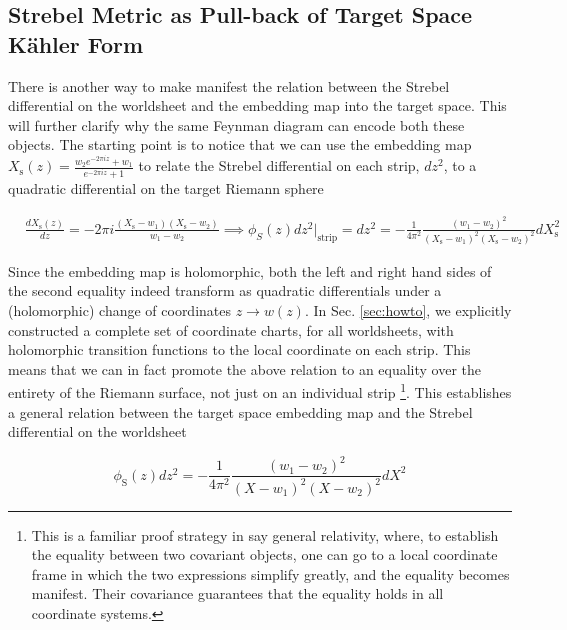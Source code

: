 \documentclass[english]{article}
\renewcommand{\>}{\rangle}
\newcommand{\<}{\langle}
\renewcommand{\(}{\left(}
\renewcommand{\)}{\right)}
\begin{document}
\subsection{Strebel Metric as Pull-back of Target Space Kähler Form} \label{sec:StrebelAsPullback}

There is another way to make manifest the relation between the Strebel differential on the worldsheet and the embedding map into the target space. This will further clarify why the same Feynman diagram can encode both these objects. The starting point is to notice that we can use the embedding map $X_{\text{s}}(z)=\frac{w_2e^{-2\pi i z}+w_1}{e^{-2\pi i z}+1}$ to relate the Strebel differential on each strip, $dz^2$, to a quadratic differential on the target Riemann sphere

\begin{equation}
     \begin{split}
         &\frac{d X_{\text{s}}(z)}{dz} = -2\pi i \frac{(X_{\text{s}}-w_1)(X_{\text{s}}-w_2)}{w_1-w_2}
         \implies \phi_{S}(z) dz^2 |_{\text{strip}} =dz^2 = -\frac{1}{4 \pi^2} \frac{(w_1-w_2)^2}{(X_{\text{s}}-w_1)^2 (X_{\text{s}}-w_2)^2 }dX_{\text{s}}^2
     \end{split}
\end{equation}

Since the embedding map is holomorphic, both the left and right hand sides of the second equality indeed transform as quadratic differentials under a (holomorphic) change of coordinates $z \rightarrow w(z)$. In Sec. \ref{sec:howto}, we explicitly constructed a complete set of coordinate charts, for all worldsheets, with holomorphic transition functions to the local coordinate on each strip. This means that we can in fact promote the above relation to an equality over the entirety of the Riemann surface, not just on an individual strip \footnote{This is a familiar proof strategy in say general relativity, where, to establish the equality between two covariant objects, one can go to a local coordinate frame in which the two expressions simplify greatly, and the equality becomes manifest. Their covariance guarantees that the equality holds in all coordinate systems. }. This establishes a general relation between the target space embedding map and the Strebel differential on the worldsheet

\begin{equation} \label{eq:StrebelAsPullback}
    \phi_{\text{S}}(z) dz^2 =  -\frac{1}{4 \pi^2} \frac{(w_1-w_2)^2}{(X-w_1)^2 (X-w_2)^2 }dX^2
 \end{equation}
\end{document}
